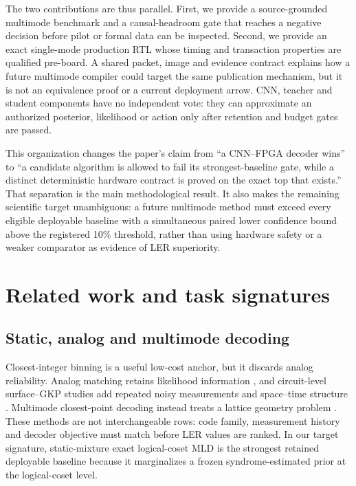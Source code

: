 \documentclass[11pt]{article}
\begin{document}
The two contributions are thus parallel.  First, we provide a source-grounded
multimode benchmark and a causal-headroom gate that reaches a negative decision
before pilot or formal data can be inspected.  Second, we provide an exact
single-mode production RTL whose timing and transaction properties are
qualified pre-board.  A shared packet, image and evidence contract explains how
a future multimode compiler could target the same publication mechanism, but
it is not an equivalence proof or a current deployment arrow.  CNN, teacher and
student components have no independent vote: they can approximate an
authorized posterior, likelihood or action only after retention and budget
gates are passed.

This organization changes the paper's claim from ``a CNN--FPGA decoder wins''
to ``a candidate algorithm is allowed to fail its strongest-baseline gate,
while a distinct deterministic hardware contract is proved on the exact top
that exists.''  That separation is the main methodological result.  It also
makes the remaining scientific target unambiguous: a future multimode method
must exceed every eligible deployable baseline with a simultaneous paired
lower confidence bound above the registered 10\% threshold, rather than using
hardware safety or a weaker comparator as evidence of LER superiority.

\section{Related work and task signatures}

\subsection{Static, analog and multimode decoding}

Closest-integer binning is a useful low-cost anchor, but it discards analog
reliability.  Analog matching retains likelihood information
\cite{fukui2018}, and circuit-level surface--GKP studies add repeated noisy
measurements and space--time structure \cite{noh2020}.  Multimode closest-point
decoding instead treats a lattice geometry problem \cite{lin2023}.  These
methods are not interchangeable rows: code family, measurement history and
decoder objective must match before LER values are ranked.  In our target
signature, static-mixture exact logical-coset MLD is the strongest retained
deployable baseline because it marginalizes a frozen syndrome-estimated prior
at the logical-coset level.
\end{document}

